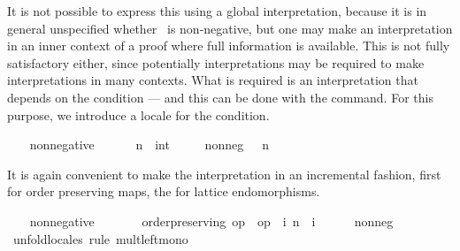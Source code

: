 \begin{isabellebody}
\begin{isamarkuptext}
  It is not possible to express this using a global interpretation,
  because it is in general unspecified whether~ is
  non-negative, but one may make an interpretation in an inner context
  of a proof where full information is available.
  This is not fully satisfactory either, since potentially
  interpretations may be required to make interpretations in many
  contexts.  What is
  required is an interpretation that depends on the condition --- and
  this can be done with the  command.  For this
  purpose, we introduce a locale for the condition.%
\end{isamarkuptext}%
\isamarkuptrue%
\ \ \isamarkupfalse%
\ non{}negative\ {}\isanewline
\ \ \ \ \ n\ {}{}\ int\isanewline
\ \ \ \ \ non{}neg{}\ {}{}\ {}\ n{}%
\begin{isamarkuptext}%
It is again convenient to make the interpretation in an
  incremental fashion, first for order preserving maps, the for
  lattice endomorphisms.%
\end{isamarkuptext}%
\isamarkuptrue%
\ \ \isamarkupfalse%
\ non{}negative\ {}\isanewline
\ \ \ \ \ \ order{}preserving\ {}op\ {}{}\ {}op\ {}{}\ {}{}i{}\ n\ {}\ i{}\isanewline
%
\isadelimproof
\ \ \ \ %
\endisadelimproof
%
\isatagproof
{}\isamarkupfalse%
\ non{}neg\ \isamarkupfalse%
\ unfold{}locales\ {}rule\ mult{}left{}mono{}%
\endisatagproof
{\isafoldproof}%
%
\isadelimproof
%
\endisadelimproof

\end{isabellebody}

